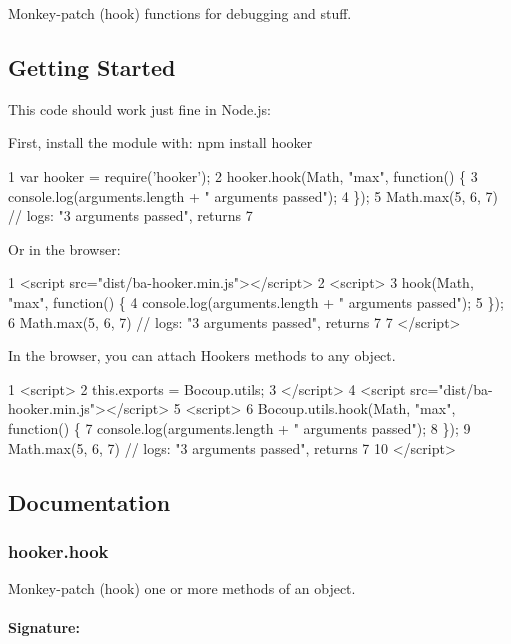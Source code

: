Monkey-\/patch (hook) functions for debugging and stuff.

\subsection*{Getting Started}

This code should work just fine in Node.\+js\+:

First, install the module with\+: {\ttfamily npm install hooker}


\begin{DoxyCode}
1 var hooker = require('hooker');
2 hooker.hook(Math, "max", function() \{
3   console.log(arguments.length + " arguments passed");
4 \});
5 Math.max(5, 6, 7) // logs: "3 arguments passed", returns 7
\end{DoxyCode}


Or in the browser\+:


\begin{DoxyCode}
1 <script src="dist/ba-hooker.min.js"></script>
2 <script>
3 hook(Math, "max", function() \{
4   console.log(arguments.length + " arguments passed");
5 \});
6 Math.max(5, 6, 7) // logs: "3 arguments passed", returns 7
7 </script>
\end{DoxyCode}


In the browser, you can attach Hooker\textquotesingle{}s methods to any object.


\begin{DoxyCode}
1 <script>
2 this.exports = Bocoup.utils;
3 </script>
4 <script src="dist/ba-hooker.min.js"></script>
5 <script>
6 Bocoup.utils.hook(Math, "max", function() \{
7   console.log(arguments.length + " arguments passed");
8 \});
9 Math.max(5, 6, 7) // logs: "3 arguments passed", returns 7
10 </script>
\end{DoxyCode}


\subsection*{Documentation}

\subsubsection*{hooker.\+hook}

Monkey-\/patch (hook) one or more methods of an object. \paragraph*{Signature\+:}

